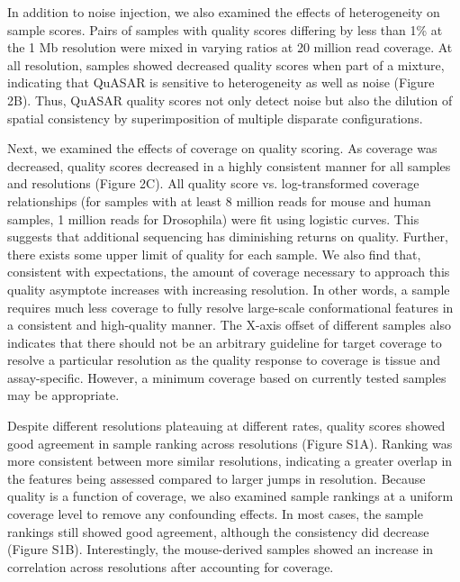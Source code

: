 In addition to noise injection, we also examined the effects of heterogeneity on sample scores. Pairs of samples with quality scores differing by less than 1\% at the 1 Mb resolution were mixed in varying ratios at 20 million read coverage. At all resolution, samples showed decreased quality scores when part of a mixture, indicating that QuASAR is sensitive to heterogeneity as well as noise (Figure 2B). Thus, QuASAR quality scores not only detect noise but also the dilution of spatial consistency by superimposition of multiple disparate configurations.

Next, we examined the effects of coverage on quality scoring. As coverage was decreased, quality scores decreased in a highly consistent manner for all samples and resolutions (Figure 2C). All quality score vs. log-transformed coverage relationships (for samples with at least 8 million reads for mouse and human samples, 1 million reads for Drosophila) were fit using logistic curves. This suggests that additional sequencing has diminishing returns on quality. Further, there exists some upper limit of quality for each sample. We also find that, consistent with expectations, the amount of coverage necessary to approach this quality asymptote increases with increasing resolution. In other words, a sample requires much less coverage to fully resolve large-scale conformational features in a consistent and high-quality manner. The X-axis offset of different samples also indicates that there should not be an arbitrary guideline for target coverage to resolve a particular resolution as the quality response to coverage is tissue and assay-specific. However, a minimum coverage based on currently tested samples may be appropriate.

Despite different resolutions plateauing at different rates, quality scores showed good agreement in sample ranking across resolutions (Figure S1A). Ranking was more consistent between more similar resolutions, indicating a greater overlap in the features being assessed compared to larger jumps in resolution. Because quality is a function of coverage, we also examined sample rankings at a uniform coverage level to remove any confounding effects. In most cases, the sample rankings still showed good agreement, although the consistency did decrease (Figure S1B). Interestingly, the mouse-derived samples showed an increase in correlation across resolutions after accounting for coverage.

